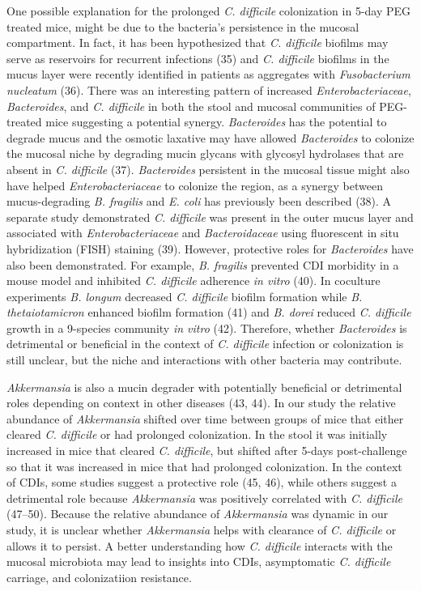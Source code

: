 \documentclass[
  11pt,
]{article}
\begin{document}
One possible explanation for the prolonged \emph{C. difficile}
colonization in 5-day PEG treated mice, might be due to the bacteria's
persistence in the mucosal compartment. In fact, it has been
hypothesized that \emph{C. difficile} biofilms may serve as reservoirs
for recurrent infections (35) and \emph{C. difficile} biofilms in the
mucus layer were recently identified in patients as aggregates with
\emph{Fusobacterium nucleatum} (36). There was an interesting pattern of
increased \emph{Enterobacteriaceae}, \emph{Bacteroides}, and \emph{C.
difficile} in both the stool and mucosal communities of PEG-treated mice
suggesting a potential synergy. \emph{Bacteroides} has the potential to
degrade mucus and the osmotic laxative may have allowed
\emph{Bacteroides} to colonize the mucosal niche by degrading mucin
glycans with glycosyl hydrolases that are absent in \emph{C. difficile}
(37). \emph{Bacteroides} persistent in the mucosal tissue might also
have helped \emph{Enterobacteriaceae} to colonize the region, as a
synergy between mucus-degrading \emph{B. fragilis} and \emph{E. coli}
has previously been described (38). A separate study demonstrated
\emph{C. difficile} was present in the outer mucus layer and associated
with \emph{Enterobacteriaceae} and \emph{Bacteroidaceae} using
fluorescent in situ hybridization (FISH) staining (39). However,
protective roles for \emph{Bacteroides} have also been demonstrated. For
example, \emph{B. fragilis} prevented CDI morbidity in a mouse model and
inhibited \emph{C. difficile} adherence \emph{in vitro} (40). In
coculture experiments \emph{B. longum} decreased \emph{C. difficile}
biofilm formation while \emph{B. thetaiotamicron} enhanced biofilm
formation (41) and \emph{B. dorei} reduced \emph{C. difficile} growth in
a 9-species community \emph{in vitro} (42). Therefore, whether
\emph{Bacteroides} is detrimental or beneficial in the context of
\emph{C. difficile} infection or colonization is still unclear, but the
niche and interactions with other bacteria may contribute.

\emph{Akkermansia} is also a mucin degrader with potentially beneficial
or detrimental roles depending on context in other diseases (43, 44). In
our study the relative abundance of \emph{Akkermansia} shifted over time
between groups of mice that either cleared \emph{C. difficile} or had
prolonged colonization. In the stool it was initially increased in mice
that cleared \emph{C. difficile}, but shifted after 5-days
post-challenge so that it was increased in mice that had prolonged
colonization. In the context of CDIs, some studies suggest a protective
role (45, 46), while others suggest a detrimental role because
\emph{Akkermansia} was positively correlated with \emph{C. difficile}
(47--50). Because the relative abundance of \emph{Akkermansia} was
dynamic in our study, it is unclear whether \emph{Akkermansia} helps
with clearance of \emph{C. difficile} or allows it to persist. A better
understanding how \emph{C. difficile} interacts with the mucosal
microbiota may lead to insights into CDIs, asymptomatic \emph{C.
difficile} carriage, and colonizatiion resistance.
\end{document}
